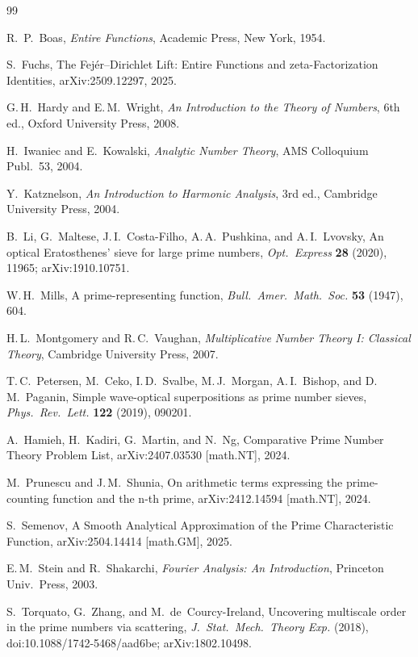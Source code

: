 \begin{thebibliography}{99}

R.~P.~Boas, \emph{Entire Functions}, Academic Press, New York, 1954.

S.~Fuchs, The Fej\'er--Dirichlet Lift: Entire Functions and zeta-Factorization Identities, arXiv:2509.12297, 2025.

G.\,H.~Hardy and E.\,M.~Wright, \emph{An Introduction to the Theory of Numbers}, 6th ed., Oxford University Press, 2008.

H.~Iwaniec and E.~Kowalski, \emph{Analytic Number Theory}, AMS Colloquium Publ.\ 53, 2004.

Y.~Katznelson, \emph{An Introduction to Harmonic Analysis}, 3rd ed., Cambridge University Press, 2004.

B.~Li, G.~Maltese, J.\,I.~Costa-Filho, A.\,A.~Pushkina, and A.\,I.~Lvovsky,
An optical Eratosthenes' sieve for large prime numbers, \emph{Opt.\ Express} \textbf{28} (2020), 11965; arXiv:1910.10751.

W.\,H.~Mills, A prime-representing function, \emph{Bull.\ Amer.\ Math.\ Soc.} \textbf{53} (1947), 604.

H.\,L.~Montgomery and R.\,C.~Vaughan, \emph{Multiplicative Number Theory I: Classical Theory}, Cambridge University Press, 2007.

T.\,C.~Petersen, M.~Ceko, I.\,D.~Svalbe, M.\,J.~Morgan, A.\,I.~Bishop, and D.\,M.~Paganin,
Simple wave-optical superpositions as prime number sieves,
\emph{Phys.\ Rev.\ Lett.} \textbf{122} (2019), 090201.

A.~Hamieh, H.~Kadiri, G.~Martin, and N.~Ng,
Comparative Prime Number Theory Problem List, arXiv:2407.03530 [math.NT], 2024.

M.~Prunescu and J.\,M.~Shunia, On arithmetic terms expressing the prime-counting function and the n-th prime, arXiv:2412.14594 [math.NT], 2024.

S.~Semenov, A Smooth Analytical Approximation of the Prime Characteristic Function, arXiv:2504.14414 [math.GM], 2025.

E.\,M.~Stein and R.~Shakarchi, \emph{Fourier Analysis: An Introduction}, Princeton Univ.\ Press, 2003.

S.~Torquato, G.~Zhang, and M.~de~Courcy-Ireland,
Uncovering multiscale order in the prime numbers via scattering, \emph{J.\ Stat.\ Mech.\ Theory Exp.} (2018), doi:10.1088/1742-5468/aad6be; arXiv:1802.10498.


\end{thebibliography}
